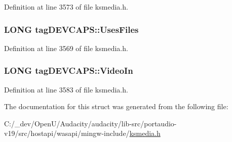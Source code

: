 Definition at line 3573 of file ksmedia.\+h.

\subsubsection[{\texorpdfstring{Uses\+Files}{UsesFiles}}]{\setlength{\rightskip}{0pt plus 5cm}L\+O\+NG tag\+D\+E\+V\+C\+A\+P\+S\+::\+Uses\+Files}\hypertarget{structtag_d_e_v_c_a_p_s_a59837eb7413094bee4770e5edea8f529}{}\label{structtag_d_e_v_c_a_p_s_a59837eb7413094bee4770e5edea8f529}


Definition at line 3569 of file ksmedia.\+h.

\subsubsection[{\texorpdfstring{Video\+In}{VideoIn}}]{\setlength{\rightskip}{0pt plus 5cm}L\+O\+NG tag\+D\+E\+V\+C\+A\+P\+S\+::\+Video\+In}\hypertarget{structtag_d_e_v_c_a_p_s_ae3d204a2b0991cab4b3dc6aa579f6020}{}\label{structtag_d_e_v_c_a_p_s_ae3d204a2b0991cab4b3dc6aa579f6020}


Definition at line 3583 of file ksmedia.\+h.



The documentation for this struct was generated from the following file\+:\begin{DoxyCompactItemize}
\item 
C\+:/\+\_\+dev/\+Open\+U/\+Audacity/audacity/lib-\/src/portaudio-\/v19/src/hostapi/wasapi/mingw-\/include/\hyperlink{ksmedia_8h}{ksmedia.\+h}\end{DoxyCompactItemize}
